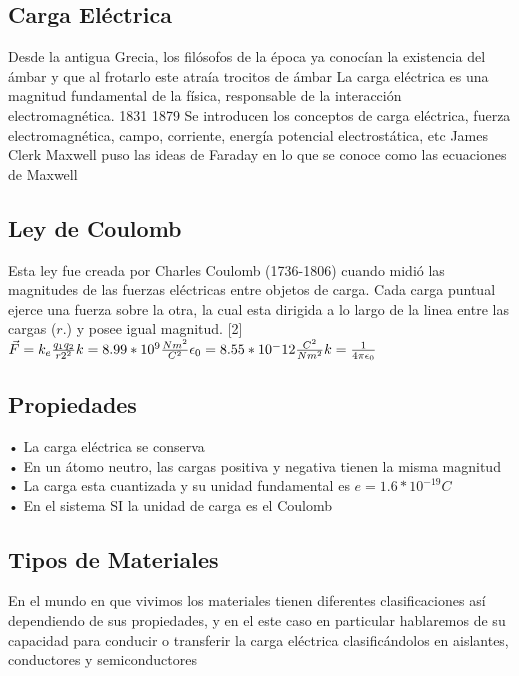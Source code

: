 \documentclass[10pt]{article}
\begin{document}
\begin{multicols}{2}
	\subsection{Carga Eléctrica}
	Desde la antigua Grecia, los filósofos de la época ya conocían la existencia del ámbar y que al frotarlo este atraía trocitos de ámbar
	La carga eléctrica es una magnitud fundamental de la física, responsable de la interacción electromagnética.
	1831
	1879 Se introducen los conceptos de carga eléctrica, fuerza
	electromagnética, campo, corriente, energía potencial electrostática, etc
	James Clerk Maxwell puso las ideas de Faraday en lo que se conoce como
	las ecuaciones de Maxwell

	\subsection{Ley de Coulomb}
	Esta ley fue creada por Charles Coulomb (1736-1806) cuando midió las magnitudes de las fuerzas eléctricas entre objetos de carga. Cada carga puntual ejerce una fuerza sobre la otra, la cual esta dirigida a lo largo de la linea entre las cargas ($r.$) y posee igual magnitud. [2]\\
	\begin{math}
		\vec{F} = k_{e} \frac{q_{1}q_{2}}{r{2^2}} \\
		k = 8.99*10^9 \frac{Nm^2}{C^2} \\
		\epsilon_{0} = 8.55*10^-12 \frac{C^2}{Nm^2} \\
		k = \frac{1}{4 \pi \epsilon_{0}} \\
	\end{math}

	\subsection{Propiedades}
	• La carga eléctrica se conserva \\
	• En un átomo neutro, las cargas
	positiva y negativa tienen la misma
	magnitud \\
	• La carga esta cuantizada y su
	unidad fundamental es
	$e = 1.6*10^{-19}C$ \\
	• En el sistema SI la unidad de
	carga es el Coulomb \\
	\subsection{Tipos de Materiales}
	En el mundo en que vivimos los materiales tienen diferentes clasificaciones así dependiendo de sus propiedades, y en el este caso en particular hablaremos de su capacidad para conducir o transferir la carga eléctrica clasificándolos en aislantes, conductores y semiconductores

\end{multicols}
\end{document}
